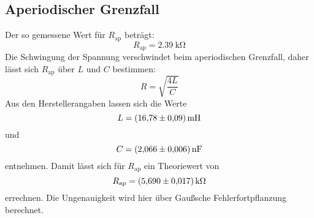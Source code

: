 \subsection{Aperiodischer Grenzfall}
Der so gemessene Wert für $R_\text{ap}$ beträgt:
\begin{equation*}
  R_\text{ap}=\SI{2.39}{\kilo\ohm}
\end{equation*}
Die Schwingung der Spannung verschwindet beim aperiodischen Grenzfall, daher lässt sich $R_\text{ap}$ über $L$ und $C$ bestimmen:
\begin{equation*}
  R=\sqrt{\frac{4L}{C}}
\end{equation*}
Aus den Herstellerangaben lassen sich die Werte
\begin{equation*}
  L=\SI{16.78\pm0.09}{\milli\henry}
\end{equation*}
und
\begin{equation*}
  C=\SI{2.066\pm0.006}{\nano\farad}
\end{equation*}
entnehmen.
Damit lässt sich für $R_\text{ap}$ ein Theoriewert von
\begin{equation*}
  R_\text{ap}=\SI{5.69\pm0.017}{\kilo\ohm}
\end{equation*}
errechnen.
Die Ungenauigkeit wird hier über Gaußsche Fehlerfortpflanzung berechnet.

